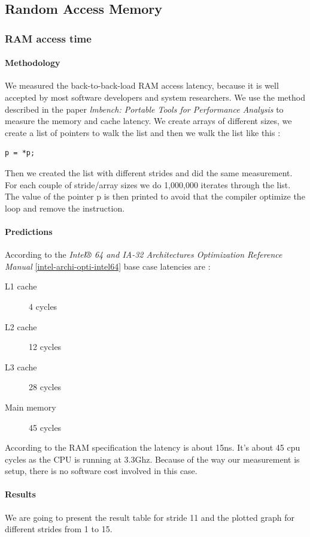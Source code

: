 \newpage
\subsection{Random Access Memory}

\subsubsection{RAM access time}
\paragraph{Methodology}
We measured the back-to-back-load RAM access latency, because it is well accepted by most software developers and system researchers.
We use the method described in the paper \emph{lmbench: Portable Tools for Performance Analysis} to measure the memory and cache latency.
We create arrays of different sizes, we create a list of pointers to walk the list and then we walk the list like this :
\begin{verbatim}
p = *p;
\end{verbatim}

Then we created the list with different strides and did the same measurement.
For each couple of stride/array sizes we do 1,000,000 iterates through the list.
The value of the pointer p is then printed to avoid that the compiler optimize the loop and remove the instruction.

\paragraph{Predictions}
According to the \emph{Intel® 64 and IA-32 Architectures Optimization Reference Manual}
\ref{intel-archi-opti-intel64} base case latencies are :
\begin{description}
\item[L1 cache] 4 cycles
\item[L2 cache] 12 cycles
\item[L3 cache] 28 cycles
\item[Main memory] 45 cycles
\end{description}
According to the RAM specification the latency is about 15ns.
It's about 45 cpu cycles as the CPU is running at 3.3Ghz. Because of the way our measurement is setup, there is no software cost involved in this case.


\paragraph{Results}
We are going to present the result table for stride 11 and the plotted graph for different strides from 1 to 15.

